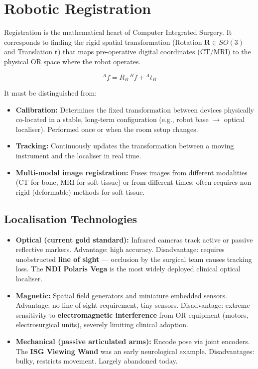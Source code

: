 \documentclass[11pt,a4paper,twoside]{report}
\begin{document}
\chapter{Robotic Registration}

Registration is the mathematical heart of Computer Integrated Surgery. It corresponds to finding the rigid spatial transformation (Rotation $\mathbf{R} \in SO(3)$ and Translation $\mathbf{t}$) that maps pre-operative digital coordinates (CT/MRI) to the physical OR space where the robot operates.

\[
{}^{A}f = R_B\,{}^{B}f + {}^{A}t_B
\]

It must be distinguished from:
\begin{itemize}
    \item \textbf{Calibration:} Determines the fixed transformation between devices physically co-located in a stable, long-term configuration (e.g., robot base $\to$ optical localiser). Performed once or when the room setup changes.
    \item \textbf{Tracking:} Continuously updates the transformation between a moving instrument and the localiser in real time.
    \item \textbf{Multi-modal image registration:} Fuses images from different modalities (CT for bone, MRI for soft tissue) or from different times; often requires non-rigid (deformable) methods for soft tissue.
\end{itemize}

\section{Localisation Technologies}
\begin{itemize}
    \item \textbf{Optical (current gold standard):} Infrared cameras track active or passive reflective markers. Advantage: high accuracy. Disadvantage: requires unobstructed \textbf{line of sight} — occlusion by the surgical team causes tracking loss. The \textbf{NDI Polaris Vega} is the most widely deployed clinical optical localiser.
    \item \textbf{Magnetic:} Spatial field generators and miniature embedded sensors. Advantage: no line-of-sight requirement, tiny sensors. Disadvantage: extreme sensitivity to \textbf{electromagnetic interference} from OR equipment (motors, electrosurgical units), severely limiting clinical adoption.
    \item \textbf{Mechanical (passive articulated arms):} Encode pose via joint encoders. The \textbf{ISG Viewing Wand} was an early neurological example. Disadvantages: bulky, restricts movement. Largely abandoned today.
\end{itemize}
\end{document}

